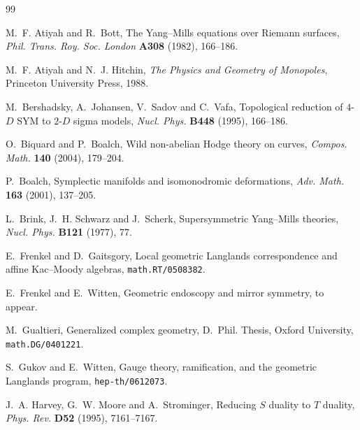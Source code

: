 {}

\begin{thebibliography}{99}\small

M.~F. Atiyah and R.~Bott,
\newblock The Yang--Mills equations over Riemann surfaces,
\newblock \emph{Phil. Trans. Roy. Soc. London} \textbf{A308} (1982), 166--186.

M.~F. Atiyah and N.~J. Hitchin,
\newblock \emph{The Physics and Geometry of Monopoles},
\newblock Princeton University Press, 1988.

M.~Bershadsky, A.~Johansen, V.~Sadov and C.~Vafa,
\newblock Topological reduction of $4$-$D$ SYM to $2$-$D$ sigma models,
\newblock \emph{Nucl. Phys.} \textbf{B448} (1995), 166--186.

O.~Biquard and P.~Boalch,
\newblock Wild non-abelian Hodge theory on curves,
\newblock \emph{Compos. Math.} \textbf{140} (2004), 179--204.

P.~Boalch,
\newblock Symplectic manifolds and isomonodromic deformations,
\newblock \emph{Adv. Math.} \textbf{163} (2001), 137--205.

L.~Brink, J.~H. Schwarz and J.~Scherk,
\newblock Supersymmetric Yang--Mills theories,
\newblock \emph{Nucl. Phys.} \textbf{B121} (1977), 77.

E.~Frenkel and D.~Gaitsgory,
\newblock Local geometric Langlands correspondence and affine Kac--Moody algebras,
\newblock \texttt{math.RT/0508382}.

E.~Frenkel and E.~Witten,
\newblock Geometric endoscopy and mirror symmetry,
\newblock to appear.

M.~Gualtieri,
\newblock Generalized complex geometry,
\newblock D.~Phil. Thesis, Oxford University, \texttt{math.DG/0401221}.

S.~Gukov and E.~Witten,
\newblock Gauge theory, ramification, and the geometric Langlands program,
\newblock \texttt{hep-th/0612073}.

J.~A. Harvey, G.~W. Moore and A.~Strominger,
\newblock Reducing $S$ duality to $T$ duality,
\newblock \emph{Phys. Rev.} \textbf{D52} (1995), 7161--7167.


\end{thebibliography}
